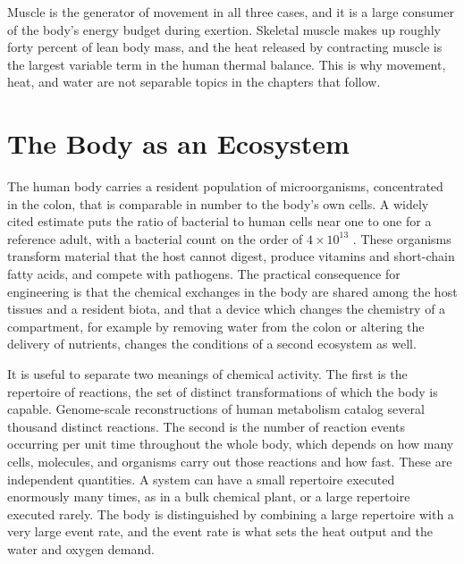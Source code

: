 \documentclass[11pt,openany]{book}
\theoremstyle{definition}
\theoremstyle{remark}
\begin{document}
Muscle is the generator of movement in all three cases, and it is a large consumer of the body's energy budget during exertion. Skeletal muscle makes up roughly forty percent of lean body mass, and the heat released by contracting muscle is the largest variable term in the human thermal balance. This is why movement, heat, and water are not separable topics in the chapters that follow.

\section{The Body as an Ecosystem}

The human body carries a resident population of microorganisms, concentrated in the colon, that is comparable in number to the body's own cells. A widely cited estimate puts the ratio of bacterial to human cells near one to one for a reference adult, with a bacterial count on the order of $4\times10^{13}$ \cite{sender2016}. These organisms transform material that the host cannot digest, produce vitamins and short-chain fatty acids, and compete with pathogens. The practical consequence for engineering is that the chemical exchanges in the body are shared among the host tissues and a resident biota, and that a device which changes the chemistry of a compartment, for example by removing water from the colon or altering the delivery of nutrients, changes the conditions of a second ecosystem as well.

It is useful to separate two meanings of chemical activity. The first is the repertoire of reactions, the set of distinct transformations of which the body is capable. Genome-scale reconstructions of human metabolism catalog several thousand distinct reactions. The second is the number of reaction events occurring per unit time throughout the whole body, which depends on how many cells, molecules, and organisms carry out those reactions and how fast. These are independent quantities. A system can have a small repertoire executed enormously many times, as in a bulk chemical plant, or a large repertoire executed rarely. The body is distinguished by combining a large repertoire with a very large event rate, and the event rate is what sets the heat output and the water and oxygen demand.
\end{document}
